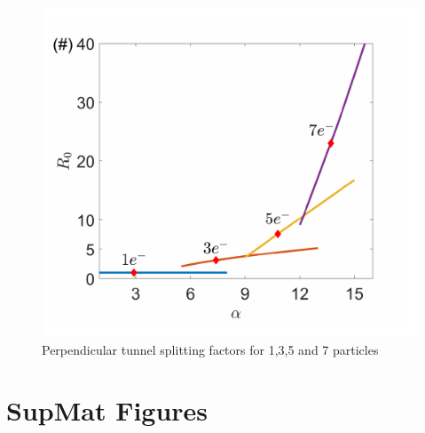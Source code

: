 \documentclass[prl,twocolumn,showpacs,preprintnumbers,amsmath,amssymb, superscriptaddress]{revtex4-2}
\newcommand{\1}{{1\hspace*{-0.5ex} \textrm{l} \hspace*{0.5ex}}}
\begin{document}
  	\begin{figure}[tbh!]
		\begin{center}
			\includegraphics[width=0.95\columnwidth]{fig_perpfactors.pdf}
			\caption{Perpendicular tunnel splitting factors for 1,3,5 and 7 particles}
			\label{fig:gap}
		\end{center}
	\end{figure}


\section{SupMat Figures}
\end{document}
